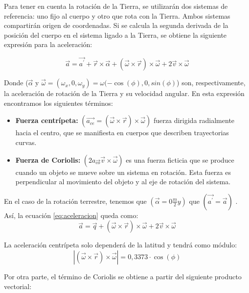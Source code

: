 \documentclass[11pt]{article}
\begin{document}
        \noindent Para tener en cuenta la rotación de la Tierra, se utilizarán dos sistemas de referencia: uno fijo al cuerpo y otro que rota con la Tierra. Ambos sistemas compartirán origen de coordenadas. Si se calcula la segunda derivada de la posición del cuerpo en el sistema ligado a la Tierra, se obtiene la siguiente expresión para la aceleración:

        \begin{equation}
            \vec{a}=\vec{a^{\prime}}+\vec{r}\times\vec{\alpha}+(\vec{\omega}\times\vec{r})\times\vec{\omega}+2\vec{v}\times\vec{\omega}
            \label{eq:aceleracion}
        \end{equation}

        \noindent Donde ($\vec{\alpha}$ y $\vec{\omega}=(\omega_{x},0,\omega_{y})=\omega(-\cos(\phi),0,sin(\phi)$) son, respectivamente, la aceleración de rotación de la Tierra y su velocidad angular. En esta expresión encontramos los siguientes términos:

        \begin{itemize}
            \item \textbf{Fuerza centrípeta:} $(\vec{a_{ce}}=(\vec{\omega}\times\vec{r})\times\vec{\omega})$ fuerza dirigida radialmente hacia el centro, que se manifiesta en cuerpos que describen trayectorias curvas.
            
            \item \textbf{Fuerza de Coriolis:} $(2a\vec{_{co}}\vec{v}\times\vec{\omega})$ es una fuerza ficticia que se produce cuando un objeto se mueve sobre un sistema en rotación. Esta fuerza es perpendicular al movimiento del objeto y al eje de rotación del sistema.
        \end{itemize}
        
        \noindent En el caso de la rotación terrestre, tenemos que $(\vec{\alpha}=0\frac{m}{2}y)$ que $(\vec{a^{\prime}}=\vec{a})$ . Así, la
        ecuación \ref{eq:aceleracion} queda como:
        \begin{equation}
            \vec{a}=\vec{q}+(\vec{\omega}\times\vec{r})\times\vec{\omega}+2\vec{v}\times\vec{\omega}
        \end{equation}
        
        \noindent La aceleración centrípeta solo dependerá de la latitud y tendrá como módulo:        
        \[\left|(\vec{\omega}\times\vec{r})\times\vec{\omega}\right|=0,3373\cdot \cos(\phi)\]
        
        \noindent Por otra parte, el término de Coriolis se obtiene a partir del siguiente producto vectorial:
\end{document}
